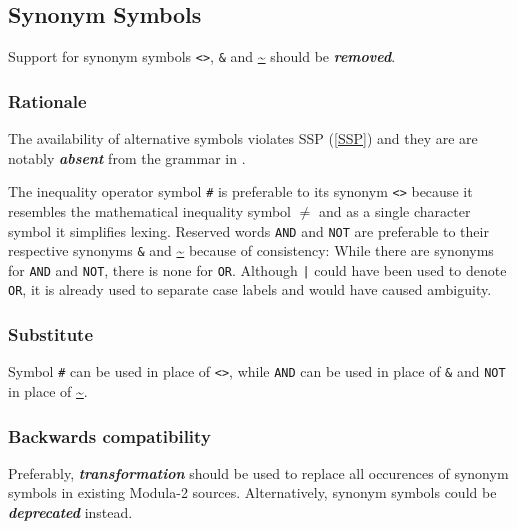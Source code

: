 \documentclass[10pt,a4paper]{article}
\renewcommand{\emph}[1]{\textbf{\textit{#1}}}
\begin{document}
\subsection{Synonym Symbols}

Support for synonym symbols \verb|<>|, \verb|&| and \url{~} should be
\emph{removed}.

\subsubsection{Rationale}

The availability of alternative symbols violates SSP (\ref{SSP}) and they are
are notably \emph{absent} from the grammar in \cite[pp.156-157]{Wirth88}.

The inequality operator symbol \verb|#| is preferable to its synonym \verb|<>|
because it resembles the mathematical inequality symbol \footnotesize
\raisebox{0.35ex} {$\neq$} \normalsize and as a single character symbol it 
simplifies lexing. Reserved words \verb|AND| and \verb|NOT| are preferable to
their respective synonyms \verb|&| and \url{~} because of consistency: While
there are synonyms for \verb|AND| and \verb|NOT|, there is none for \verb|OR|.
Although \verb!|! could have been used to denote \verb|OR|, it is already used
to separate case labels and would have caused ambiguity.

\subsubsection{Substitute}

Symbol \verb|#| can be used in place of \verb|<>|, while \verb|AND| can be used
in place of \verb|&| and \verb|NOT| in place of \url{~}.

\subsubsection{Backwards compatibility}

Preferably, \emph{transformation} should be used to replace all occurences of synonym symbols in existing Modula-2 sources. Alternatively, synonym symbols could be \emph{deprecated} instead.


\end{document}
